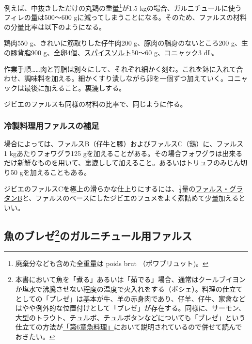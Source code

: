 \begin{recette}
例えば、中抜きしただけの丸鶏の重量\footnote{廃棄分なども含めた全重量は
  poids brut （ポワブリュット)。}が1.5
kgの場合、ガルニチュールに使うフィレの量は500〜600
gに減ってしまうことになる。そのため、ファルスの材料の分量比率は以下のようになる。

鶏肉550 g、きれいに筋取りした仔牛肉200 g、豚肉の脂身のないところ200
g、生の豚背脂900
g、全卵4個、\protect\hyperlink{sel-epice}{スパイスソルト}50〜60
g、コニャック3 dL。

作業手順\ldots{}\ldots{}肉と背脂は別々にして、それぞれ細かく刻む。これを鉢に入れて合わせ、調味料を加える。細かくすり潰しながら卵を一個ずつ加えていく。コニャックは最後に加えること。裏漉しする。

ジビエのファルスも同様の材料の比率で、同じように作る。

\atoaki{}

\hypertarget{observation-sur-les-farces}{%
\subsubsection{冷製料理用ファルスの補足}\label{observation-sur-les-farces}}

場合によっては、ファルスB（仔牛と豚）およびファルスC（鶏）に、ファルス 1
kgあたりフォワグラ125
gを加えることがある。その場合フォワグラは出来るだけ新鮮なものを用いて、裏漉しして加えること。あるいはトリュフのみじん切り50
gを加えることもある。

ジビエのファルスCを極上の滑らかな仕上りにするには、\(\frac{1}{4}\)量の\protect\hyperlink{farce-gratin-b}{ファルス・グラタンB}と、ファルスのベースにしたジビエのフュメをよく煮詰めて少量加えるといい。

\end{recette}

\begin{Main}

\hypertarget{farces-speciales-pour-garnir-les-poissons-braises}{%
\subsection[魚のブレゼのガルニチュール用ファルス]{\texorpdfstring{魚のブレゼ\footnote{本書において魚を「煮る」あるいは「茹でる」場合、通常はクールブイヨンか塩水で沸騰させない程度の温度で火入れをする（ポシェ）。料理の仕立てとしての「ブレゼ」は基本が牛、羊の赤身肉であり、仔羊、仔牛、家禽などはやや例外的な位置付けとして「ブレゼ」が存在する。同様に、サーモン、大型のトラウト、チュルボ、チュルボタンなどについても「ブレゼ」という仕立ての方法が\protect\hyperlink{cuisson-des-poissons-par-le-braisage}{「第6章魚料理」}において説明されているので併せて読んでおきたい。}のガルニチュール用ファルス}{魚のブレゼのガルニチュール用ファルス}}\label{farces-speciales-pour-garnir-les-poissons-braises}}


\end{Main}

